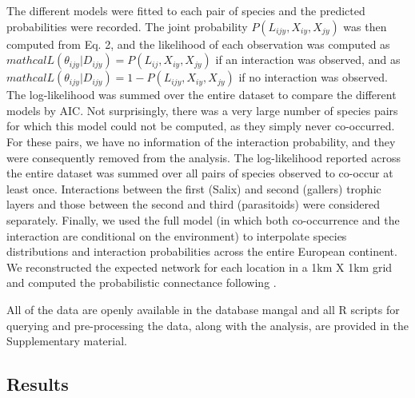 \documentclass[12pt]{article}
\begin{document}
The different models were fitted to each pair of species and the 
predicted probabilities were recorded. The joint probability $P(L_{ijy},X_{iy},X_{jy})$
was then computed from Eq. 2, and the likelihood of each observation was
computed as $mathcal{L}(\theta_{ijy}|D_{ijy})=P(L_{ij},X_{iy},X_{jy})$ if an
interaction was observed, and as
$mathcal{L}(\theta_{ijy}|D_{ijy})=1-P(L_{ijy},X_{iy},X_{jy})$ if no
interaction was observed. The log-likelihood was summed over the entire
dataset to compare the different models by AIC. Not surprisingly, there was a
very large number of species pairs for which this model could not be computed,
as they simply never co-occurred. For these pairs, we have no information of
the interaction probability, and they were consequently removed from the
analysis. The log-likelihood reported across the entire dataset was summed
over all pairs of species observed to co-occur at least once. Interactions
between the first (Salix) and second (gallers) trophic layers and those
between the second and third (parasitoids) were considered separately.
Finally, we used the full model (in which both co-occurrence and the
interaction are conditional on the environment) to interpolate species
distributions and interaction probabilities across the entire European
continent. We reconstructed the expected network for each location in a 1km X
1km grid and computed the probabilistic connectance following
\citep{Poisot2015b}.  

All of the data are openly available in the database mangal \citep{Poisot2015c} and
all R scripts for querying and pre-processing the data, along with the
analysis, are provided in the Supplementary material.

\subsection*{Results}  
\end{document}
